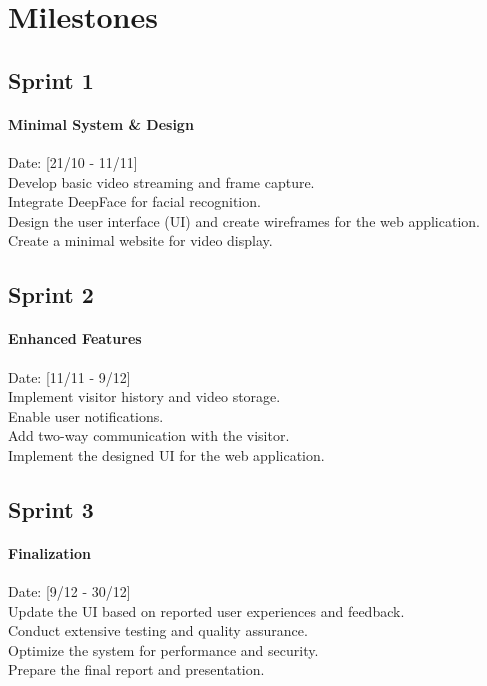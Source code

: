 \documentclass[a4 paper, 12pt]{article}
\begin{document}
\section{Milestones}
\subsection{Sprint 1}
\paragraph{Minimal System \& Design}
    Date: [21/10 - 11/11]\\
    Develop basic video streaming and frame capture.\\
    Integrate DeepFace for facial recognition.\\
    Design the user interface (UI) and create wireframes for the web application. \\
    Create a minimal website for video display.

\subsection{Sprint 2}
\paragraph{Enhanced Features}
    Date: [11/11 - 9/12]\\
    Implement visitor history and video storage.\\
    Enable user notifications.\\
    Add two-way communication with the visitor. \\
    Implement the designed UI for the web application.

\subsection{Sprint 3}
\paragraph{Finalization}
    Date: [9/12 - 30/12]\\
    Update the UI based on reported user experiences and feedback. \\
    Conduct extensive testing and quality assurance.\\
    Optimize the system for performance and security.\\
    Prepare the final report and presentation.
\end{document}
